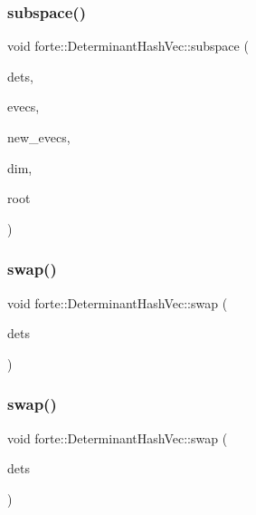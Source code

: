 \subsubsection{\texorpdfstring{subspace()}{subspace()}}
{\footnotesize\ttfamily void forte\+::\+Determinant\+Hash\+Vec\+::subspace (\begin{DoxyParamCaption}\item[{\mbox{\hyperlink{classforte_1_1_determinant_hash_vec}{Determinant\+Hash\+Vec}} \&}]{dets,  }\item[{std\+::shared\+\_\+ptr$<$ psi\+::\+Matrix $>$}]{evecs,  }\item[{std\+::vector$<$ double $>$ \&}]{new\+\_\+evecs,  }\item[{size\+\_\+t}]{dim,  }\item[{int}]{root }\end{DoxyParamCaption})}

\mbox{\label{classforte_1_1_determinant_hash_vec_a03d8f6394ae12862b2e4c782dcab82fa}} 
\subsubsection{\texorpdfstring{swap()}{swap()}\hspace{0.1cm}{\footnotesize\ttfamily [1/2]}}
{\footnotesize\ttfamily void forte\+::\+Determinant\+Hash\+Vec\+::swap (\begin{DoxyParamCaption}\item[{\mbox{\hyperlink{classforte_1_1_determinant_hash_vec}{Determinant\+Hash\+Vec}} \&}]{dets }\end{DoxyParamCaption})}

\mbox{\label{classforte_1_1_determinant_hash_vec_af5b7b59cac7ddccd0c0b595b9bb3e6d2}} 
\subsubsection{\texorpdfstring{swap()}{swap()}\hspace{0.1cm}{\footnotesize\ttfamily [2/2]}}
{\footnotesize\ttfamily void forte\+::\+Determinant\+Hash\+Vec\+::swap (\begin{DoxyParamCaption}\item[{\mbox{\hyperlink{namespaceforte_aee00ff2f656f0aa613d3f9f1ba01cad5}{det\+\_\+hashvec}} \&}]{dets }\end{DoxyParamCaption})}

